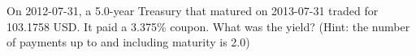 On 2012-07-31, a 5.0-year Treasury that matured on 2013-07-31 traded for 103.1758 USD. It paid a 3.375\% coupon. What was the yield? (Hint: the number of payments up to and including maturity is 2.0)
